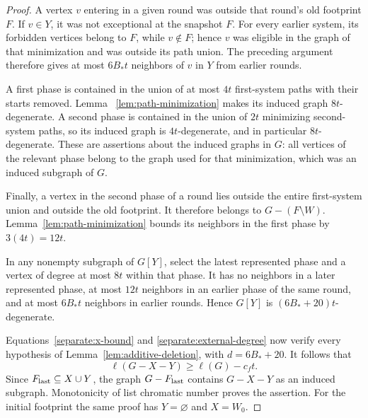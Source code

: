 \begin{proof}
A vertex \(v\) entering in a given round was outside that round's
old footprint \(F\). If \(v\in Y\), it was not exceptional at the
snapshot \(F\). For every earlier system, its forbidden vertices
belong to \(F\), while \(v\notin F\); hence \(v\) was eligible in
the graph of that minimization and was outside its path union.
The preceding argument therefore gives at most \(6B_*t\) neighbors
of \(v\) in \(Y\) from earlier rounds.

A first phase is contained in the union of at most \(4t\)
first-system paths with their starts removed. Lemma~
\ref{lem:path-minimization} makes its induced graph \(8t\)-degenerate.
A second phase is contained in the union of \(2t\) minimizing
second-system paths, so its induced graph is \(4t\)-degenerate,
and in particular \(8t\)-degenerate. These are assertions about
the induced graphs in \(G\): all vertices of the relevant phase
belong to the graph used for that minimization, which was an
induced subgraph of \(G\).

Finally, a vertex in the second phase of a round lies outside
the entire first-system union and outside the old footprint.
It therefore belongs to \(G-(F\setminus W)\).
Lemma~\ref{lem:path-minimization} bounds its neighbors in the first
phase by \(3(4t)=12t\).

In any nonempty subgraph of \(G[Y]\), select the latest represented
phase and a vertex of degree at most \(8t\) within that phase.
It has no neighbors in a later represented phase, at most \(12t\)
neighbors in an earlier phase of the same round, and at most
\(6B_*t\) neighbors in earlier rounds. Hence \(G[Y]\) is
\((6B_*+20)t\)-degenerate.

Equations~\eqref{separate:x-bound} and
\eqref{separate:external-degree} now verify every hypothesis of
Lemma~\ref{lem:additive-deletion}, with \(d=6B_*+20\).
It follows that
\[
 \ell(G-X-Y)\ge\ell(G)-c_ft.
\]
Since \(F_{\rm last}\subseteq X\cup Y\), the graph
\(G-F_{\rm last}\) contains \(G-X-Y\) as an induced subgraph.
Monotonicity of list chromatic number proves the assertion.
For the initial footprint the same proof has \(Y=\varnothing\)
and \(X=W_0\).
\end{proof}

